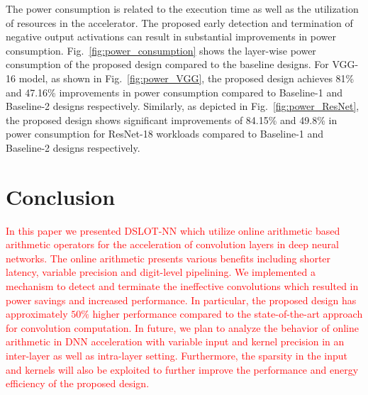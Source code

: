 \documentclass[conference]{IEEEtran}
\begin{document}
The power consumption is related to the execution time as well as the utilization of resources in the accelerator. The proposed early detection and termination of negative output activations can result in substantial improvements in power consumption. Fig.~\ref{fig:power_consumption} shows the layer-wise power consumption of the proposed design compared to the baseline designs. For VGG-16 model, as shown in Fig.~\ref{fig:power_VGG}, the proposed design achieves 81\% and 47.16\% improvements in power consumption compared to Baseline-1 and Baseline-2 designs respectively. Similarly, as depicted in Fig.~\ref{fig:power_ResNet}, the proposed design shows significant improvements of 84.15\% and 49.8\% in power consumption for ResNet-18 workloads compared to Baseline-1 and Baseline-2 designs respectively. 




\section{Conclusion} \label{sec: Conclusion}
\textcolor{red}{In this paper we presented DSLOT-NN which utilize online arithmetic based arithmetic operators for the acceleration of  convolution layers in deep neural networks. The online arithmetic presents various benefits including shorter latency, variable precision and digit-level pipelining. We implemented a mechanism to detect and terminate the ineffective convolutions which resulted in power savings and increased performance. In particular, the proposed design has approximately $50\%$ higher performance compared to the state-of-the-art approach for convolution computation. In future, we plan to analyze the behavior of online arithmetic in DNN acceleration with variable input and kernel precision in an inter-layer as well as intra-layer setting. Furthermore, the sparsity in the input and kernels will also be exploited to further improve the performance and energy efficiency of the proposed design.}












\vspace{12pt}
\end{document}
